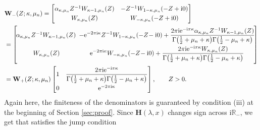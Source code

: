 \documentclass[11pt]{article}
\numberwithin{equation}{section}
\numberwithin{equation}{section}
\newcommand{\ee}{\mathrm{e}}
\newcommand{\ii}{\mathrm{i}}
\newcommand{\para}[1]{\breve{#1}}
\begin{document}
\begin{align*} %
 &\mathbf{W}_{-}(Z;\kappa,\mu_n) =
 \begin{bmatrix}
 \alpha_{\kappa,\mu_n}Z^{-1}W_{\kappa-1,\mu_n}(Z) & -Z^{-1}W_{1-\kappa,\mu_n}(-Z+\ii 0)\vspace{1mm}\\
 W_{\kappa,\mu_n}(Z) & W_{-\kappa,\mu_n}(-Z+\ii 0)
 \end{bmatrix}\\
 & =\begin{bmatrix}
 \! \alpha_{\kappa,\mu_n}Z^{-1}W_{\kappa-1,\mu_n}(Z) \!&\displaystyle\!\! -\ee^{-2\pi \ii\kappa}Z^{-1} W_{1-\kappa,\mu_n}(-Z\!-\ii 0)+\frac{2\pi \ii\ee^{-\ii\pi\kappa}\alpha_{\kappa,\mu_n}Z^{-1}W_{\kappa-1,\mu_n}(Z)}{\Gamma\big(\frac{1}{2} +\mu_n+\kappa\big)\Gamma\big(\frac{1}{2} -\mu_n+\kappa\big)} \! \vspace{1mm}\\
 W_{\kappa,\mu_n}(Z)\!& \!\displaystyle \ee^{-2\pi \ii\kappa}W_{-\kappa,\mu_n}(-Z\!-\ii 0) +
 \frac{2\pi \ii \ee^{-\ii\pi\kappa}W_{\kappa,\mu_n}(Z)}{\Gamma\big(\frac{1}{2} +\mu_n+\kappa\big)\Gamma\big(\frac{1}{2} -\mu_n+\kappa\big)}
 \end{bmatrix} \\
 & =\mathbf{W}_{+}(Z;\kappa,\mu_n)\begin{bmatrix}
 1 & \displaystyle \frac{2\pi \ii\ee^{-\ii\pi\kappa}}{\Gamma\big(\frac{1}{2}+\mu_n+\kappa\big)\Gamma\big(\frac{1}{2}-\mu_n+\kappa\big)} \vspace{1mm} \\
 0 & \ee^{-2\pi \ii\kappa}
 \end{bmatrix},\qquad Z>0.
\end{align*}
Again here, the finiteness of the denominators is guaranteed by condition (iii) at the beginning of Section \ref{sec:proof}. Since $\mathbf{H}(\lambda,x)$ changes sign across $\ii\mathbb{R}_-$, we get that \smash{$\para{\mathbf{\Phi}}^{(\infty)}(\lambda)=\para{\mathbf{\Phi}}^{(\infty)}_n(\lambda,x)$} satisfies the jump condition
\end{document}
